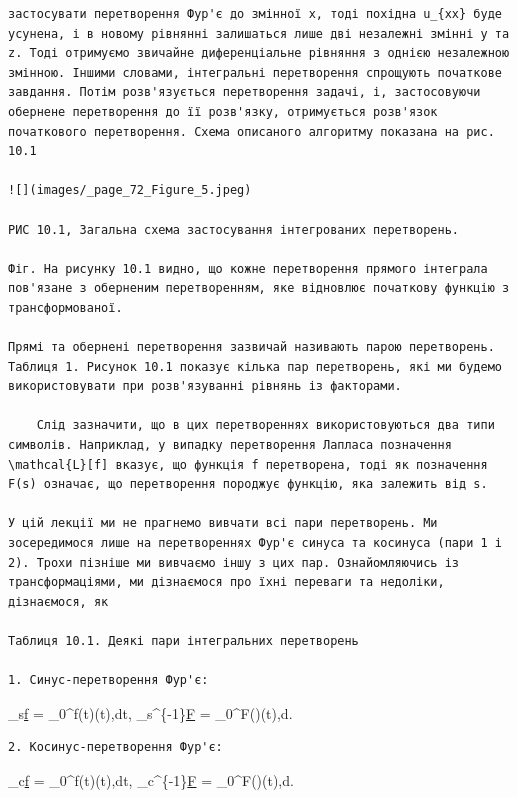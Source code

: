 \documentclass[
  ukrainian,
]{article}
\begin{document}
\begin{verbatim}
застосувати перетворення Фур'є до змінної x, тоді похідна u_{xx} буде усунена, і в новому рівнянні залишаться лише дві незалежні змінні y та z. Тоді отримуємо звичайне диференціальне рівняння з однією незалежною змінною. Іншими словами, інтегральні перетворення спрощують початкове завдання. Потім розв'язується перетворення задачі, і, застосовуючи обернене перетворення до її розв'язку, отримується розв'язок початкового перетворення. Схема описаного алгоритму показана на рис. 10.1

![](images/_page_72_Figure_5.jpeg)

РИС 10.1, Загальна схема застосування інтегрованих перетворень.

Фіг. На рисунку 10.1 видно, що кожне перетворення прямого інтеграла пов'язане з оберненим перетворенням, яке відновлює початкову функцію з трансформованої.

Прямі та обернені перетворення зазвичай називають парою перетворень. Таблиця 1. Рисунок 10.1 показує кілька пар перетворень, які ми будемо використовувати при розв'язуванні рівнянь із факторами.

    Слід зазначити, що в цих перетвореннях використовуються два типи символів. Наприклад, у випадку перетворення Лапласа позначення \mathcal{L}[f] вказує, що функція f перетворена, тоді як позначення F(s) означає, що перетворення породжує функцію, яка залежить від s.

У цій лекції ми не прагнемо вивчати всі пари перетворень. Ми зосередимося лише на перетвореннях Фур'є синуса та косинуса (пари 1 і 2). Трохи пізніше ми вивчаємо іншу з цих пар. Ознайомляючись із трансформаціями, ми дізнаємося про їхні переваги та недоліки, дізнаємося, як

Таблиця 10.1. Деякі пари інтегральних перетворень

1. Синус-перетворення Фур'є:
\end{verbatim}

\_s\href{/omega}{f} =
\int\_0\^{}\infty f(t)\sin(\omega t),dt,
\_s\^{}\{-1\}\href{t}{F} =
\int\_0\^{}\infty F(\omega)\sin(\omega t),d\omega.

\begin{verbatim}
2. Косинус-перетворення Фур'є:
\end{verbatim}

\_c\href{/omega}{f} =
\int\_0\^{}\infty f(t)\cos(\omega t),dt,
\_c\^{}\{-1\}\href{t}{F} =
\int\_0\^{}\infty F(\omega)\cos(\omega t),d\omega.
\end{document}
